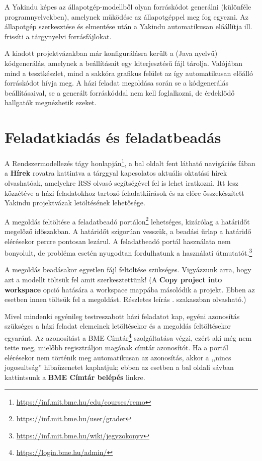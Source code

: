 A Yakindu képes az állapotgép-modellből olyan forráskódot generálni (különféle programnyelvekben), amelynek működése az állapotgéppel meg fog egyezni. Az állapotgép szerkesztése és elmentése után a Yakindu automatikusan előállítja ill. frissíti a tárgynyelvi forrásfájlokat.

A kiadott projektvázakban már konfigurálásra került a (Java nyelvű) kódgenerálás, amelynek a beállításait egy  kiterjesztésű fájl tárolja. Valójában mind a tesztkészlet, mind a sakkóra grafikus felület az így automatikusan előálló forráskódot hívja meg. A házi feladat megoldása során se a kódgenerálás beállításaival, se a generált forráskóddal nem kell foglalkozni, de érdeklődő hallgatók megnézhetik ezeket.

\section{Feladatkiadás és feladatbeadás}
\label{sec:feladatkiadas-es-feladatbeadas}

A Rendszermodellezés tágy honlapján\footnote{\url{https://inf.mit.bme.hu/edu/courses/remo}}, a bal oldalt fent látható navigációs fában a \textbf{Hírek} rovatra kattintva a tárggyal kapcsolatos aktuális oktatási hírek olvashatóak, amelyekre RSS olvasó segítségével fel is lehet iratkozni. Itt lesz közzétéve a házi feladatokhoz tartozó feladatkiírások és az előre összekészített Yakindu projektvázak letöltésének lehetősége.

A megoldás feltöltése a feladatbeadó portálon\footnote{\url{https://inf.mit.bme.hu/user/grader}} lehetséges, kizárólag a határidőt megelőző időszakban. A határidőt szigorúan vesszük, a beadási űrlap a határidő elérésekor percre pontosan lezárul. A feladatbeadó portál használata nem bonyolult, de probléma esetén nyugodtan fordulhatunk a használati útmutatót.\footnote{\url{https://inf.mit.bme.hu/wiki/jegyzokonyv}}

\begin{figyelmeztetes}
A megoldás beadásakor egyetlen  fájl feltöltése szükséges.
Vigyázzunk arra, hogy azt a modellt töltsük fel amit szerkesztettünk! (A \textbf{Copy project into workspace} opció hatására a workspace mappába másolódik a projekt. Ebben az esetben innen töltsük fel a megoldást. Részletes leírás . szakaszban olvasható.)
\end{figyelmeztetes}

Mivel mindenki egyénileg testreszabott házi feladatot kap, egyéni azonosítás szükséges a házi feladat elemeinek letöltésekor és a megoldás feltöltésekor egyaránt. Az azonosítást a BME Címtár\footnote{\url{https://login.bme.hu/admin/}} szolgáltatása végzi, ezért aki még nem tette meg, mielőbb regisztráljon magának címtár azonosítót. Ha a portál elérésekor nem történik meg automatikusan az azonosítás, akkor a ,,nincs jogosultság'' hibaüzenetet kaphatjuk; ebben az esetben a bal oldali sávban kattintsunk a \textbf{BME Címtár belépés} linkre.
